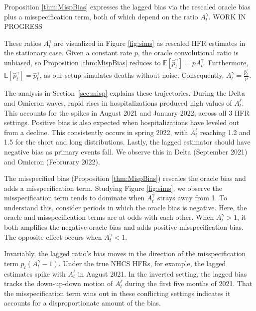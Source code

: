 \documentclass{article}
\renewcommand{\hat}{\widehat} %
\begin{document}
Proposition \ref{thm:MispBias} expresses the lagged bias via the rescaled oracle bias plus a misspecification term, both of which depend on the ratio $A_t^\gamma$. WORK IN PROGRESS

These ratios $A_t^\gamma$ are visualized in Figure \ref{fig:sims} as rescaled HFR estimates in the stationary case.
Given a constant rate $p$, the oracle convolutional ratio is unbiased, so Proposition \ref{thm:MispBias} reduces to $\mathbb{E}[\hat{p}_t^\gamma] = p A_t^\gamma$. Furthermore, $\mathbb{E}[\hat{p}_t^\gamma] = \hat{p}_t^\gamma$, as our setup simulates deaths without noise. Consequently, $A_t^\gamma = \frac{\hat{p}_t^\gamma }{p}$. 

The analysis in Section~\ref{sec:misp} explains these trajectories. During the Delta and Omicron waves, rapid rises in hospitalizations produced high values of $A_t^\ell$. This accounts for the spikes in August 2021 and January 2022, across all 3 HFR settings. Positive bias is also expected when hospitalizations have leveled out from a decline. This consistently occurs in spring 2022, with $A_t^\ell$ reaching 1.2 and 1.5 for the short and long distributions. Lastly, the lagged estimator should have negative bias as primary events fall. We observe this in Delta (September 2021) and Omicron (Februrary 2022). 

The misspecified bias (Proposition \ref{thm:MispBias}) rescales the oracle bias and adds a misspecification term. Studying Figure \ref{fig:sims}, we observe the misspecification term tends to dominate when $A_t^\gamma$ strays away from 1. To understand this, consider periods in which the oracle bias is negative. Here, the oracle and misspecification terms are at odds with each other. 
When $A_t^\gamma > 1$, it both amplifies the negative oracle bias and adds positive misspecification bias. The opposite effect occurs when $A_t^\gamma<1$. 

Invariably, the lagged ratio's bias moves in the direction of the misspecification term $p_t(A_t^\gamma-1)$. Under the true NHCS HFRs, for example, the lagged estimates spike with $A_t^\ell$ in August 2021. In the inverted setting, the lagged bias tracks the down-up-down motion of $A_t^\ell$ during the first five months of 2021. That the misspecification term wins out in these conflicting settings indicates it accounts for a disproportionate amount of the bias. 
\end{document}
